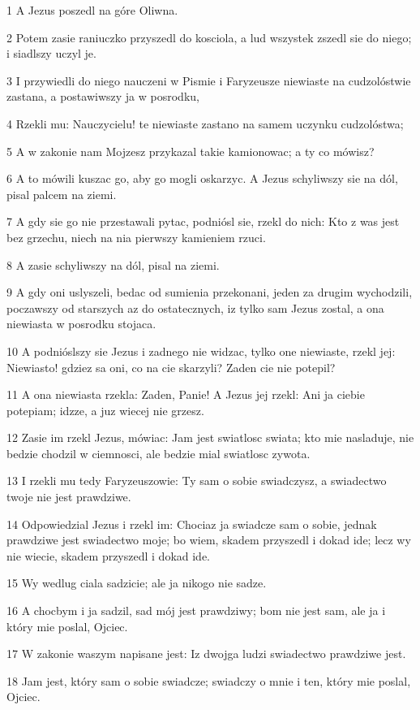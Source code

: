 \par 1 A Jezus poszedl na góre Oliwna.
\par 2 Potem zasie raniuczko przyszedl do kosciola, a lud wszystek zszedl sie do niego; i siadlszy uczyl je.
\par 3 I przywiedli do niego nauczeni w Pismie i Faryzeusze niewiaste na cudzolóstwie zastana, a postawiwszy ja w posrodku,
\par 4 Rzekli mu: Nauczycielu! te niewiaste zastano na samem uczynku cudzolóstwa;
\par 5 A w zakonie nam Mojzesz przykazal takie kamionowac; a ty co mówisz?
\par 6 A to mówili kuszac go, aby go mogli oskarzyc. A Jezus schyliwszy sie na dól, pisal palcem na ziemi.
\par 7 A gdy sie go nie przestawali pytac, podniósl sie, rzekl do nich: Kto z was jest bez grzechu, niech na nia pierwszy kamieniem rzuci.
\par 8 A zasie schyliwszy na dól, pisal na ziemi.
\par 9 A gdy oni uslyszeli, bedac od sumienia przekonani, jeden za drugim wychodzili, poczawszy od starszych az do ostatecznych, iz tylko sam Jezus zostal, a ona niewiasta w posrodku stojaca.
\par 10 A podnióslszy sie Jezus i zadnego nie widzac, tylko one niewiaste, rzekl jej: Niewiasto! gdziez sa oni, co na cie skarzyli? Zaden cie nie potepil?
\par 11 A ona niewiasta rzekla: Zaden, Panie! A Jezus jej rzekl: Ani ja ciebie potepiam; idzze, a juz wiecej nie grzesz.
\par 12 Zasie im rzekl Jezus, mówiac: Jam jest swiatlosc swiata; kto mie nasladuje, nie bedzie chodzil w ciemnosci, ale bedzie mial swiatlosc zywota.
\par 13 I rzekli mu tedy Faryzeuszowie: Ty sam o sobie swiadczysz, a swiadectwo twoje nie jest prawdziwe.
\par 14 Odpowiedzial Jezus i rzekl im: Chociaz ja swiadcze sam o sobie, jednak prawdziwe jest swiadectwo moje; bo wiem, skadem przyszedl i dokad ide; lecz wy nie wiecie, skadem przyszedl i dokad ide.
\par 15 Wy wedlug ciala sadzicie; ale ja nikogo nie sadze.
\par 16 A chocbym i ja sadzil, sad mój jest prawdziwy; bom nie jest sam, ale ja i który mie poslal, Ojciec.
\par 17 W zakonie waszym napisane jest: Iz dwojga ludzi swiadectwo prawdziwe jest.
\par 18 Jam jest, który sam o sobie swiadcze; swiadczy o mnie i ten, który mie poslal, Ojciec.

